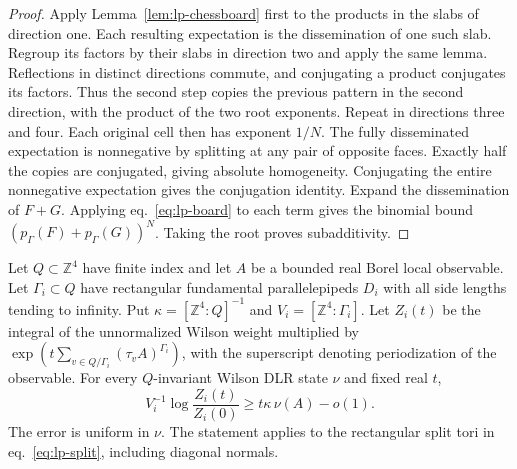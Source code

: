 \documentclass[11pt,letterpaper,reqno]{amsart}
\makeatletter
\numberwithin{equation}{section}
\renewcommand{\eqref}[1]{\textup{eq.~\ref{#1}}}
\theoremstyle{definition}
\newcommand{\ms@minorstart}{%
  \pushQED{\qed}\renewcommand{\qedsymbol}{$\blacksquare$}}
\newenvironment{lemma}[1][]{\ms@minorstart\ms@lemma[#1]}
  {\popQED\endms@lemma}
\theoremstyle{remark}
\makeatother
\begin{document}
\begin{proof}
Apply Lemma~\ref{lem:lp-chessboard} first to the products in the
slabs of direction one. Each resulting expectation is the
dissemination of one such slab. Regroup its factors by their
slabs in direction two and apply the same lemma. Reflections
in distinct directions commute, and conjugating a product
conjugates its factors. Thus the second step copies the previous
pattern in the second direction, with the product of the two
root exponents. Repeat in directions three and four.
Each original cell then has exponent \(1/N\).
The fully disseminated expectation is nonnegative by splitting
at any pair of opposite faces. Exactly half the copies are
conjugated, giving absolute homogeneity. Conjugating the entire
nonnegative expectation gives the conjugation identity.
Expand the dissemination of \(F+G\). Applying \eqref{eq:lp-board}
to each term gives the binomial bound
\((p_\Gamma(F)+p_\Gamma(G))^N\). Taking the root proves subadditivity.
\end{proof}

\begin{lemma}[Gibbs lower tangent]\label{lem:lp-lower-tangent}
Let \(Q\subset\mathbb Z^4\) have finite index and let \(A\) be a
bounded real Borel local observable. Let \(\Gamma_i\subset Q\)
have rectangular fundamental parallelepipeds \(D_i\) with all
side lengths tending to infinity. Put
\(\kappa=[\mathbb Z^4:Q]^{-1}\) and \(V_i=[\mathbb Z^4:\Gamma_i]\).
Let \(Z_i(t)\) be the integral of the unnormalized Wilson weight
multiplied by
\(\exp(t\sum_{v\in Q/\Gamma_i}(\tau_vA)^{\Gamma_i})\), with the
superscript denoting periodization of the observable.
For every \(Q\)-invariant Wilson DLR state \(\nu\) and fixed real \(t\),
\begin{equation}\label{eq:lp-lower-tangent}
        V_i^{-1}\log\frac{Z_i(t)}{Z_i(0)}
                 \ge t\kappa\,\nu(A)-o(1).
\end{equation}
The error is uniform in \(\nu\). The statement applies to the
rectangular split tori in \eqref{eq:lp-split}, including diagonal
normals.
\end{lemma}
\end{document}
